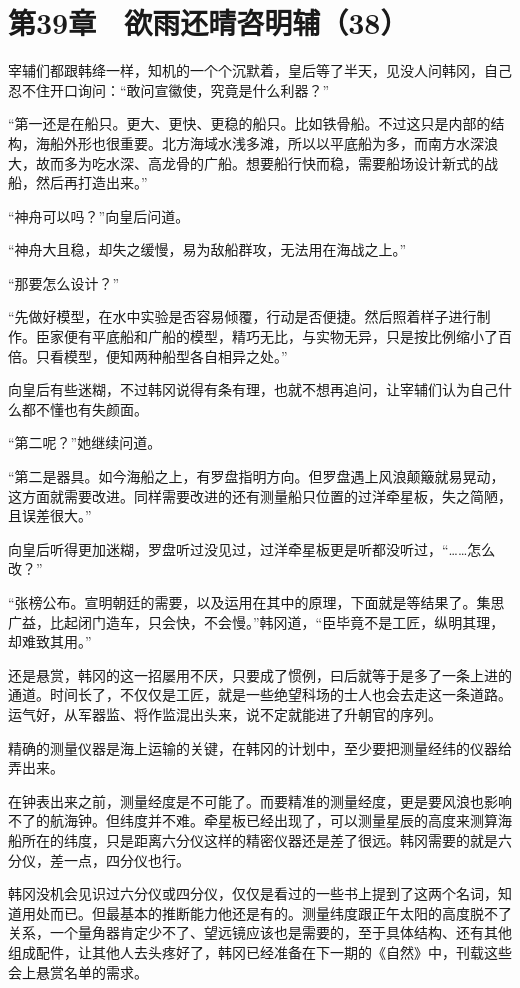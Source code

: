 \section{第39章　欲雨还晴咨明辅（38）}

宰辅们都跟韩绛一样，知机的一个个沉默着，皇后等了半天，见没人问韩冈，自己忍不住开口询问：“敢问宣徽使，究竟是什么利器？”

“第一还是在船只。更大、更快、更稳的船只。比如铁骨船。不过这只是内部的结构，海船外形也很重要。北方海域水浅多滩，所以以平底船为多，而南方水深浪大，故而多为吃水深、高龙骨的广船。想要船行快而稳，需要船场设计新式的战船，然后再打造出来。”

“神舟可以吗？”向皇后问道。

“神舟大且稳，却失之缓慢，易为敌船群攻，无法用在海战之上。”

“那要怎么设计？”

“先做好模型，在水中实验是否容易倾覆，行动是否便捷。然后照着样子进行制作。臣家便有平底船和广船的模型，精巧无比，与实物无异，只是按比例缩小了百倍。只看模型，便知两种船型各自相异之处。”

向皇后有些迷糊，不过韩冈说得有条有理，也就不想再追问，让宰辅们认为自己什么都不懂也有失颜面。

“第二呢？”她继续问道。

“第二是器具。如今海船之上，有罗盘指明方向。但罗盘遇上风浪颠簸就易晃动，这方面就需要改进。同样需要改进的还有测量船只位置的过洋牵星板，失之简陋，且误差很大。”

向皇后听得更加迷糊，罗盘听过没见过，过洋牵星板更是听都没听过，“……怎么改？”

“张榜公布。宣明朝廷的需要，以及运用在其中的原理，下面就是等结果了。集思广益，比起闭门造车，只会快，不会慢。”韩冈道，“臣毕竟不是工匠，纵明其理，却难致其用。”

还是悬赏，韩冈的这一招屡用不厌，只要成了惯例，曰后就等于是多了一条上进的通道。时间长了，不仅仅是工匠，就是一些绝望科场的士人也会去走这一条道路。运气好，从军器监、将作监混出头来，说不定就能进了升朝官的序列。

精确的测量仪器是海上运输的关键，在韩冈的计划中，至少要把测量经纬的仪器给弄出来。

在钟表出来之前，测量经度是不可能了。而要精准的测量经度，更是要风浪也影响不了的航海钟。但纬度并不难。牵星板已经出现了，可以测量星辰的高度来测算海船所在的纬度，只是距离六分仪这样的精密仪器还是差了很远。韩冈需要的就是六分仪，差一点，四分仪也行。

韩冈没机会见识过六分仪或四分仪，仅仅是看过的一些书上提到了这两个名词，知道用处而已。但最基本的推断能力他还是有的。测量纬度跟正午太阳的高度脱不了关系，一个量角器肯定少不了、望远镜应该也是需要的，至于具体结构、还有其他组成配件，让其他人去头疼好了，韩冈已经准备在下一期的《自然》中，刊载这些会上悬赏名单的需求。

